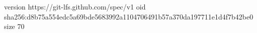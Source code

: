 version https://git-lfs.github.com/spec/v1
oid sha256:d8b75a554edc5a69bde5683992a1104706491b57a370da197711e1d4f7b42be0
size 70
